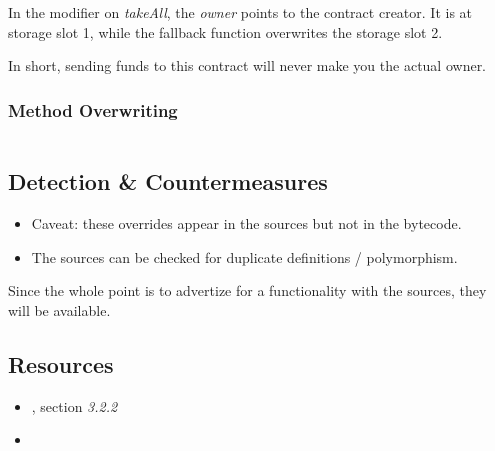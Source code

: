 In the modifier on \emph{takeAll}, the \emph{owner} points to the contract creator.
It is at storage slot 1, while the fallback function overwrites the storage slot 2.

In short, sending funds to this contract will never make you the actual owner.

\subsubsection{Method Overwriting}

\begin{highlight}
\begin{lstlisting}

\end{lstlisting}
\end{highlight}

\subsection{Detection \& Countermeasures}

\begin{itemize}
\item{Caveat: these overrides appear in the sources but not in the bytecode.}
\item{The sources can be checked for duplicate definitions / polymorphism.}
\end{itemize}

Since the whole point is to advertize for a functionality with the sources, they will be available.

\subsection{Resources}

\begin{itemize}
\item{\cite{paper-art-of-the-scam}, section \emph{3.2.2}}
\item{\cite{video-masquerading-code}}
\end{itemize}
